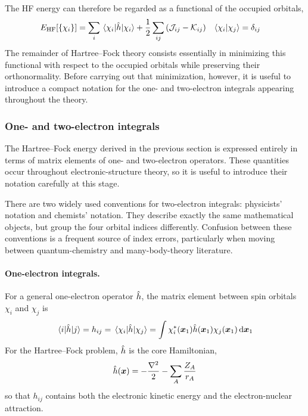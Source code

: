 \documentclass[11pt,a4paper,titlepage]{article}
\numberwithin{equation}{section}
\newcommand{\EHF}{E_\text{HF}}
\newcommand{\bx}{\boldsymbol{x}}
\newcommand{\hh}{\Hat{h}}
\newcommand{\cJ}{\mathcal{J}}
\newcommand{\cK}{\mathcal{K}}
\begin{document}
The HF energy can therefore be regarded as a functional of the occupied
orbitals,
\begin{align}
  \EHF[\{\chi_i\}]
  & =
  \sum_i
  \mel{\chi_i}{\hh}{\chi_i}
  +
  \frac{1}{2}
  \sum_{ij}
  \qty(
    \cJ_{ij}-\cK_{ij}
  )
  & 
  \braket{\chi_i}{\chi_j}& =\delta_{ij}
  \label{eq:hf-energy-functional}
\end{align}
The remainder of Hartree--Fock theory consists essentially in minimizing this
functional with respect to the occupied orbitals while preserving their
orthonormality. Before carrying out that minimization, however, it is useful
to introduce a compact notation for the one- and two-electron integrals
appearing throughout the theory.

\subsubsection{One- and two-electron integrals}

The Hartree--Fock energy derived in the previous section is expressed entirely
in terms of matrix elements of one- and two-electron operators. These
quantities occur throughout electronic-structure theory, so it is useful to
introduce their notation carefully at this stage.

There are two widely used conventions for two-electron integrals:
physicists' notation and chemists' notation. They describe
exactly the same mathematical objects, but group the four orbital indices
differently. Confusion between these conventions is a frequent source of
index errors, particularly when moving between quantum-chemistry and
many-body-theory literature.

\paragraph{One-electron integrals.}

For a general one-electron operator $\hh$, the matrix element between spin
orbitals $\chi_i$ and $\chi_j$ is
\begin{equation}
  \mel{i}{\hh}{j}
  =
  h_{ij}
  =
  \mel*{\chi_i}{\hh}{\chi_j}
  =
  \int
  \chi_i^*(\bx_1)
  \hh(\bx_1)
  \chi_j(\bx_1)
  \dd{\bx_1}
  \label{eq:one-electron-integral}
\end{equation}
For the Hartree--Fock problem, $\hh$ is the core Hamiltonian,
\begin{equation}
  \hh(\bx)
  =
  -\frac{\laplacian}{2}
  -
  \sum_A\frac{Z_A}{r_A}
\end{equation}
so that $h_{ij}$ contains both the electronic kinetic energy and the
electron-nuclear attraction.
\end{document}
